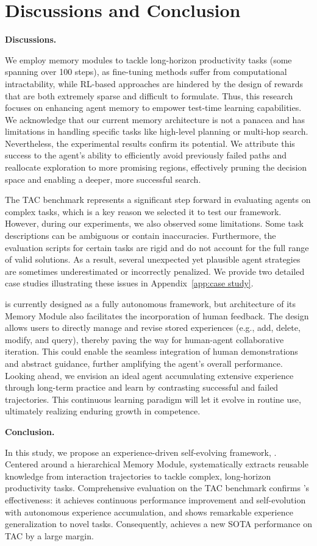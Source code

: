 \section{Discussions and Conclusion}

\textbf{Discussions.}

We employ memory modules to tackle long-horizon productivity tasks (some spanning over 100 steps), as fine-tuning methods suffer from computational intractability, while RL-based approaches are hindered by the design of rewards that are both extremely sparse and difficult to formulate.
Thus, this research focuses on enhancing agent memory to empower test-time learning capabilities. We acknowledge that our current memory architecture is not a panacea and has limitations in handling specific tasks like high-level planning or multi-hop search. Nevertheless, the experimental results confirm its potential. We attribute this success to the agent's ability to efficiently avoid previously failed paths and reallocate exploration to more promising regions, effectively pruning the decision space and enabling a deeper, more successful search.


The TAC benchmark represents a significant step forward in evaluating agents on complex tasks, which is a key reason we selected it to test our framework. However, during our experiments, we also observed some limitations.  Some task descriptions can be ambiguous or contain inaccuracies. Furthermore, the evaluation scripts for certain tasks are rigid and do not account for the full range of valid solutions. As a result, several unexpected yet plausible agent strategies are sometimes underestimated or incorrectly penalized. We provide two detailed case studies illustrating these issues in Appendix~\ref{app:case study}.



 {\method} is currently designed as a fully autonomous framework, but architecture of its Memory Module also facilitates the incorporation of human feedback. The design allows users to directly manage and revise stored experiences (e.g., add, delete, modify, and query), thereby paving the way for human-agent collaborative iteration. This could enable the seamless integration of human demonstrations and abstract guidance, further amplifying the agent's overall performance.
Looking ahead, we envision an ideal agent accumulating extensive experience through long-term practice and learn by contrasting successful and failed trajectories. This continuous learning paradigm will let it evolve in routine use, ultimately realizing enduring growth in competence.

\textbf{Conclusion.}

In this study, we propose an experience-driven self-evolving framework, {\method}. Centered around a hierarchical Memory Module, {\method} systematically extracts reusable knowledge from interaction trajectories to tackle complex, long-horizon productivity tasks.
Comprehensive evaluation on the TAC benchmark confirms {\method}'s effectiveness: it achieves continuous performance improvement and self-evolution with autonomous experience accumulation, and shows remarkable experience generalization to novel tasks. Consequently, {\method} achieves a new SOTA performance on TAC by a large margin.